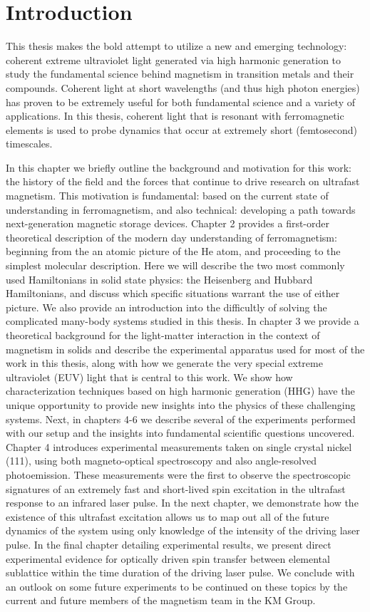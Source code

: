 \chapter{Introduction}
\label{introchap}

This thesis makes the bold attempt to utilize a new and emerging technology: coherent extreme ultraviolet light generated via high harmonic generation to study the fundamental science behind magnetism in transition metals and their compounds. Coherent light at short wavelengths (and thus high photon energies) has proven to be extremely useful for both fundamental science and a variety of applications. In this thesis, coherent light that is resonant with ferromagnetic elements is used to probe dynamics that occur at extremely short (femtosecond) timescales.

In this chapter we briefly outline the background and motivation for this work: the history of the field and the forces that continue to drive research on ultrafast magnetism. This motivation is fundamental: based on the current state of understanding in ferromagnetism, and also technical: developing a path towards next-generation magnetic storage devices. Chapter 2 provides a first-order theoretical description of the modern day understanding of ferromagnetism: beginning from the an atomic picture of the He atom, and proceeding to the simplest molecular description. Here we will describe the two most commonly used Hamiltonians in solid state physics: the Heisenberg and Hubbard Hamiltonians, and discuss which specific situations warrant the use of either picture. We also provide an introduction into the difficultly of solving the complicated many-body systems studied in this thesis. In chapter 3 we provide a theoretical background for the light-matter interaction in the context of magnetism in solids and describe the experimental apparatus used for most of the work in this thesis, along with how we generate the very special extreme ultraviolet (EUV) light that is central to this work. We show how characterization techniques based on high harmonic generation (HHG) have the unique opportunity to provide new insights into the physics of these challenging systems. Next, in chapters 4-6 we describe several of the experiments performed with our setup and the insights into fundamental scientific questions uncovered. Chapter 4 introduces experimental measurements taken on single crystal nickel (111), using both magneto-optical spectroscopy and also angle-resolved photoemission. These measurements were the first to observe the spectroscopic signatures of an extremely fast and short-lived spin excitation in the ultrafast response to an infrared laser pulse. In the next chapter, we demonstrate how the existence of this ultrafast excitation allows us to map out all of the future dynamics of the system using only knowledge of the intensity of the driving laser pulse. In the final chapter detailing experimental results, we present direct experimental evidence for optically driven spin transfer between elemental sublattice within the time duration of the driving laser pulse. We conclude with an outlook on some future experiments to be continued on these topics by the current and future members of the magnetism team in the KM Group.

